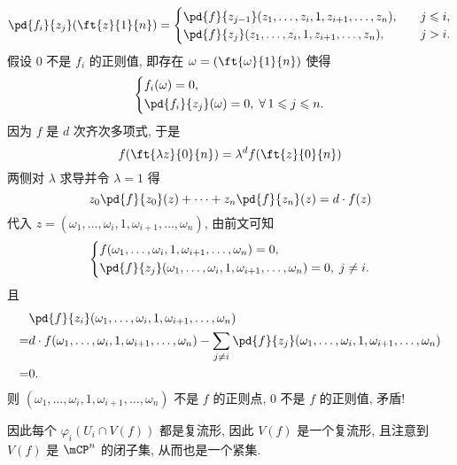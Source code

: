 \begin{example}[齐次多项式零点定义的射影空间的子集]
            \begin{equation*}
                \pd{f_i}{z_j}(\ft{z}{1}{n}) =
                \begin{cases}
                    \pd{f}{z_{j-1}}(z_1,\dots,z_{i},1,z_{i+1},\dots,z_n),&\quad j\leqslant i, \\
                    \pd{f}{z_{j}}(z_1,\dots,z_{i},1,z_{i+1},\dots,z_n),&\quad j > i.
                \end{cases}
            \end{equation*}
            假设 $0$ 不是 $f_i$ 的正则值, 即存在 $\omega = (\ft{\omega}{1}{n})$ 使得
            \begin{equation*}
                \left\{
                    \begin{aligned}
                        &f_i(\omega) = 0, \\
                        &\pd{f_i}{z_j}(\omega) = 0,\;\forall\,1\leqslant j\leqslant n.
                    \end{aligned}
                \right.
            \end{equation*}
            因为 $f$ 是 $d$ 次齐次多项式, 于是 
            \begin{equation*}
                f(\ft{\lambda z}{0}{n}) = \lambda^{d}f(\ft{z}{0}{n})
            \end{equation*}
            两侧对 $\lambda$ 求导并令 $\lambda = 1$ 得 
            \begin{equation*}
                z_0\pd{f}{z_0}(z)+\cdots+z_n\pd{f}{z_n}(z) = d\cdot f(z)
            \end{equation*}
            代入 $z = (\omega_1,\dots,\omega_{i},1,\omega_{i+1},\dots,\omega_n)$, 由前文可知
            \begin{equation*}
                \left\{
                    \begin{aligned}
                        &f(\omega_1,\dots,\omega_{i},1,\omega_{i+1},\dots,\omega_n) = 0, \\
                        &\pd{f}{z_j}(\omega_1,\dots,\omega_{i},1,\omega_{i+1},\dots,\omega_n) = 0,\;j\neq i.
                    \end{aligned}
                \right.
            \end{equation*}
            且
            \begin{align*}
                &\pd{f}{z_i}(\omega_1,\dots,\omega_{i},1,\omega_{i+1},\dots,\omega_n) \\
                =& d\cdot f(\omega_1,\dots,\omega_{i},1,\omega_{i+1},\dots,\omega_n) - \sum_{j \neq i}\pd{f}{z_j}(\omega_1,\dots,\omega_{i},1,\omega_{i+1},\dots,\omega_n) \\
                =& 0.
            \end{align*}
            则 $(\omega_1,\dots,\omega_{i},1,\omega_{i+1},\dots,\omega_n)$ 不是 $f$ 的正则点, $0$ 不是 $f$ 的正则值, 矛盾!
            
            因此每个 $\varphi_i\left(U_i\cap V(f)\right)$ 都是复流形, 因此 $V(f)$ 是一个复流形, 且注意到 $V(f)$ 是 $\mCP^n$ 的闭子集, 从而也是一个紧集.
        \end{example}

